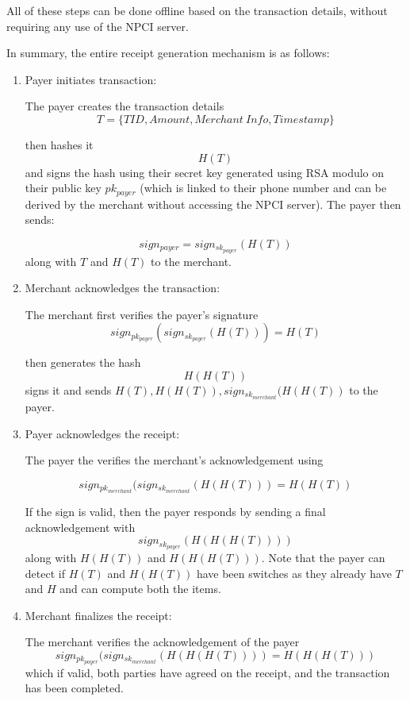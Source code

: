 \documentclass{ashoka-crypto}
\begin{document}
All of these steps can be done offline based on the transaction details, without requiring any use of the NPCI server.

In summary, the entire receipt generation mechanism is as follows:

\begin{enumerate}
\item Payer initiates transaction:

The payer creates the transaction details
\[T = \{TID, Amount, Merchant \> Info, Timestamp\}\]

then hashes it \[H(T)\] and signs the hash using their secret key generated using RSA modulo on their public key $pk_{payer}$ (which is linked to their phone number and can be derived by the merchant without accessing the NPCI server). The payer then sends:

\[sign_{payer} = sign_{sk_{payer}}(H(T))\] along with $T$ and $H(T)$ to the merchant.

\item Merchant acknowledges the transaction:

The merchant first verifies the payer's signature
\[sign_{pk_{payer}}(sign_{sk_{payer}}(H(T))) = H(T)\]

then generates the hash \[H(H(T))\] signs it and sends $H(T), H(H(T)), sign_{sk_{merchant}}(H(H(T))$ to the payer. 

\item Payer acknowledges the receipt:

The payer the verifies the merchant's acknowledgement using 

\[sign_{pk_{merchant}}(sign_{sk_{merchant}}(H(H(T))) = H(H(T))\]

If the sign is valid, then the payer responds by sending a final acknowledgement with \[sign_{sk_{payer}}(H(H(H(T))))\] along with $H(H(T))$ and $H(H(H(T)))$. Note that the payer can detect if $H(T)$ and $H(H(T))$ have been switches as they already have $T$ and $H$ and can compute both the items.

\item Merchant finalizes the receipt:

The merchant verifies the acknowledgement of the payer \[sign_{pk_{payer}}(sign_{sk_{merchant}}(H(H(H(T)))) = H(H(H(T)))\] which if valid, both parties have agreed on the receipt, and the transaction has been completed.
\end{enumerate}
\end{document}
